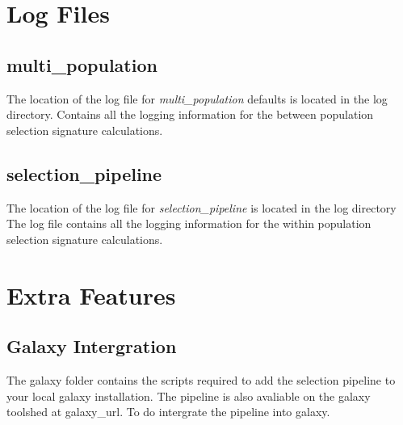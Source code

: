 \documentclass[a4paper,10pt]{article}
\begin{document}
\section{Log Files}
\subsection{multi\_population}
The location of the log file for  \emph{multi\_population} defaults is located in the log directory. Contains all the logging information for the between population selection signature calculations.
\subsection{selection\_pipeline}
The location of the log file for \emph{selection\_pipeline} is located in the log directory The log file contains all the logging information for the within population selection signature calculations.

\section{Extra Features}

\subsection{Galaxy Intergration}
The galaxy folder contains the scripts required to add the selection pipeline to your local galaxy installation. The pipeline is also avaliable on the galaxy toolshed at galaxy\_url. To do intergrate the pipeline into galaxy.
\end{document}

